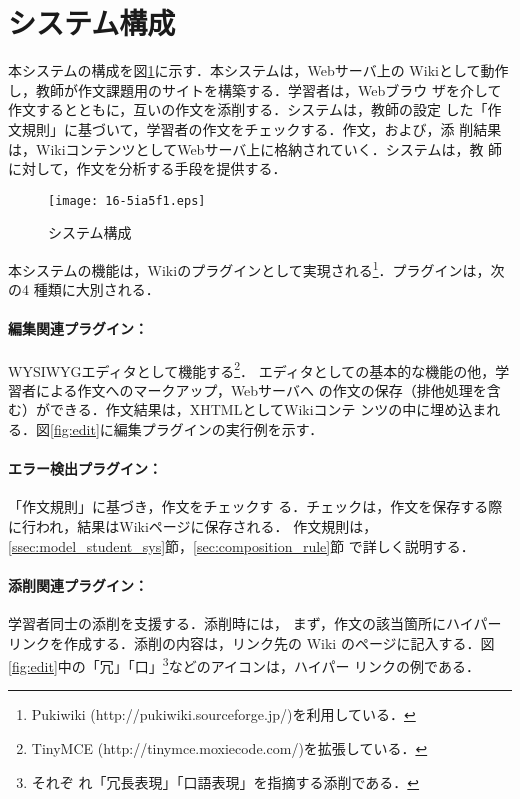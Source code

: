 \documentclass[japanese]{jnlp_1.4}
\def\mod{}
\begin{document}
{\mod
\section{システム構成}\label{sec:system_structure}

本システムの構成を図\ref{fig:system}に示す．本システムは，Webサーバ上の
Wikiとして動作し，教師が作文課題用のサイトを構築する．学習者は，Webブラウ
ザを介して作文するとともに，互いの作文を添削する．システムは，教師の設定
した「作文規則」に基づいて，学習者の作文をチェックする．作文，および，添
削結果は，WikiコンテンツとしてWebサーバ上に格納されていく．システムは，教
師に対して，作文を分析する手段を提供する．


\begin{figure}[b]
 \begin{center}
  \texttt{[image: 16-5ia5f1.eps]}
  \caption{システム構成}
  \label{fig:system}
 \end{center}   
\end{figure}

本システムの機能は，Wikiのプラグインとして実現される\footnote{Pukiwiki
(http://pukiwiki.sourceforge.jp/)を利用している．}．プラグインは，次の4
種類に大別される．


\paragraph{編集関連プラグイン：}WYSIWYGエディタとして機能する\footnote{
	TinyMCE (http://tinymce.moxiecode.com/)を拡張している．}．
エディタとしての基本的な機能の他，学習者による作文へのマークアップ，Webサーバへ
の作文の保存（排他処理を含む）ができる．作文結果は，XHTMLとしてWikiコンテ
ンツの中に埋め込まれる．図\ref{fig:edit}に編集プラグインの実行例を示す．

\paragraph{エラー検出プラグイン：}「作文規則」に基づき，作文をチェックす
る．チェックは，作文を保存する際に行われ，結果はWikiページに保存される．
作文規則は，\ref{ssec:model_student_sys}節，\ref{sec:composition_rule}節
で詳しく説明する．



\paragraph{添削関連プラグイン：} 学習者同士の添削を支援する．添削時には，
まず，作文の該当箇所にハイパーリンクを作成する．添削の内容は，リンク先の
Wiki のページに記入する．図\ref{fig:edit}中の「冗」「口」\footnote{それぞ
れ「冗長表現」「口語表現」を指摘する添削である．}などのアイコンは，ハイパー
リンクの例である．

}
\end{document}
